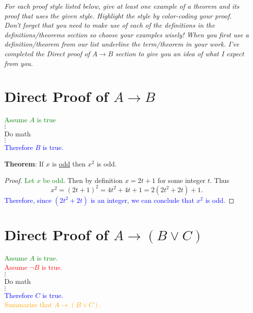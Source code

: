 \documentclass[11pt, oneside]{article}
\begin{document}
\newpage

\noindent \textit{For each proof style listed below, give at least one example of a theorem and its proof that uses the given style.  Highlight the style by color-coding your proof.  Don't forget that you need to make use of each of the definitions in the definitions/theorems section so choose your examples wisely!  When you first use a definition/theorem from our list underline the term/theorem in your work.  I've completed the Direct proof of $A \rightarrow B$ section  to give you an idea of what I expect from you.}

\section{Direct Proof of $A \rightarrow B$}

		\begin{center} 
		\textcolor{green}{Assume $A$ is true} \\
		 $\vdots$ \\ Do math \\ $\vdots$ \\
		\textcolor{blue}{Therefore $B$ is true.}\\[0.2in]
		\end{center} 


\noindent \textbf{Theorem}:  If $x$ is \underline{odd} then $x^2$ is odd. 
\begin{proof}  \textcolor{green}{Let $x$ be odd}.  Then by definition $x=2t+1$ for some integer $t$.  Thus 
$$x^2 = (2t + 1)^2=4t^2 + 4t + 1 =2(2t^2+2t) +1.$$
\textcolor{blue}{Therefore, since $(2t^2+2t)$ is an integer,  we can conclude that  $x^2$ is odd.}
\end{proof}

\newpage

\section{Direct Proof of $A \rightarrow (B \vee C)$}

		\begin{center} 
		\textcolor{green}{Assume $A$ is true.} \\
		\textcolor{red}{Assume $\neg B$ is true.}\\ 
 		$\vdots$ \\ Do math \\ $\vdots$ \\
 		\textcolor{blue}{Therefore $C$ is true.} \\ 
 		\textcolor{orange}{Summarize that $A \rightarrow (B \vee C)$.}\\[0.2in]
 		\end{center} 
\end{document}
